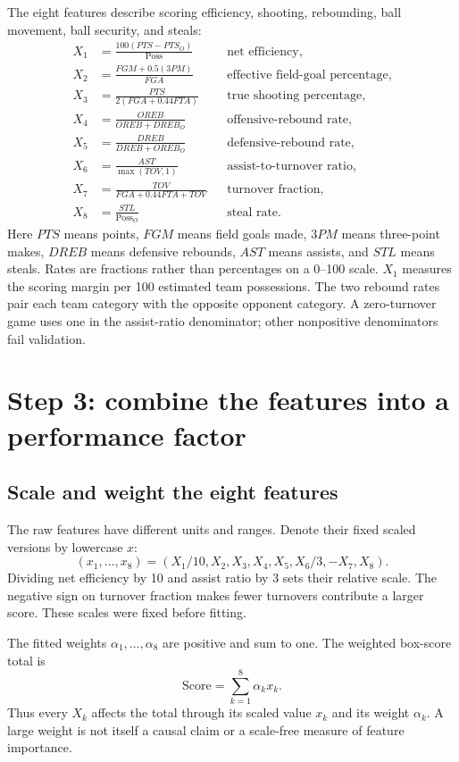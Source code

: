 \documentclass[11pt]{article}
\begin{document}
The eight features describe scoring efficiency, shooting, rebounding,
ball movement, ball security, and steals:
\begin{align}
 X_1&=\frac{100(PTS-PTS_O)}{\mathrm{Poss}}
 &&\text{net efficiency},\\
 X_2&=\frac{FGM+0.5(3PM)}{FGA}
 &&\text{effective field-goal percentage},\\
 X_3&=\frac{PTS}{2(FGA+0.44FTA)}
 &&\text{true shooting percentage},\\
 X_4&=\frac{OREB}{OREB+DREB_O}
 &&\text{offensive-rebound rate},\\
 X_5&=\frac{DREB}{DREB+OREB_O}
 &&\text{defensive-rebound rate},\\
 X_6&=\frac{AST}{\max(TOV,1)}
 &&\text{assist-to-turnover ratio},\\
 X_7&=\frac{TOV}{FGA+0.44FTA+TOV}
 &&\text{turnover fraction},\\
 X_8&=\frac{STL}{\mathrm{Poss}_O}
 &&\text{steal rate}.
\end{align}
Here $PTS$ means points, $FGM$ means field goals made, $3PM$ means three-point
makes, $DREB$ means defensive rebounds, $AST$ means assists, and $STL$ means
steals. Rates are fractions rather than percentages on a 0--100 scale.
$X_1$ measures the scoring margin per 100 estimated team possessions. The two rebound
rates pair each team category with the opposite opponent category. A
zero-turnover game uses one in the assist-ratio denominator; other
nonpositive denominators fail validation.

\section{Step 3: combine the features into a performance factor}\label{sec:performance}
\subsection{Scale and weight the eight features}
The raw features have different units and ranges. Denote their fixed scaled
versions by lowercase $x$:
\begin{equation}\label{eq:scaled-features}
 (x_1,\ldots,x_8)=(X_1/10,X_2,X_3,X_4,X_5,X_6/3,-X_7,X_8).
\end{equation}
Dividing net efficiency by 10 and assist ratio by 3 sets their relative scale.
The negative sign on turnover fraction makes fewer turnovers contribute a
larger score. These scales were fixed before fitting.

The fitted weights $\alpha_1,\ldots,\alpha_8$ are positive and sum to one.
The weighted box-score total is
\begin{equation}\label{eq:game-score}
 \mathrm{Score}=\sum_{k=1}^{8}\alpha_k x_k.
\end{equation}
Thus every $X_k$ affects the total through its scaled value $x_k$ and its
weight $\alpha_k$. A large weight is not itself a causal claim or a scale-free
measure of feature importance.
\end{document}
